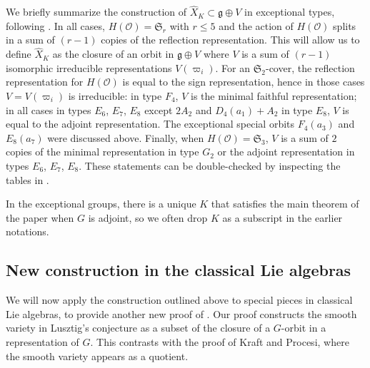 \documentclass{amsart}
\theoremstyle{definition}
\newcommand{\g}{\mathfrak{g}}
\newcommand{\0}{\mathcal{O}}
\begin{document}
We briefly summarize the construction of $\hat{X}_K\subset\g\oplus V$ in exceptional types, following \cite{Sommers:Localsystems}.
In all cases, $H(\0)=\mathfrak{S}_r$ with $r\leq 5$ and the action of $H(\0)$ splits in a sum of $(r-1)$ copies of the reflection representation.
This will allow us to define $\hat{X}_K$ as the closure of an orbit in $\g\oplus V$ where $V$ is a sum of $(r-1)$ isomorphic irreducible representations $V(\varpi_i)$.
For an $\mathfrak{S}_2$-cover, the reflection representation for $H(\0)$ is equal to the sign representation, hence in those cases $V=V(\varpi_i)$ is irreducible: in type $F_4$, $V$ is the minimal faithful representation; in all cases in types $E_6$, $E_7$, $E_8$ except $2A_2$ and $D_4(a_1)+A_2$ in type $E_8$, $V$ is equal to the adjoint representation.
The exceptional special orbits $F_4(a_3)$ and $E_8(a_7)$ were discussed above.
Finally, when $H(\0)=\mathfrak{S}_3$, $V$ is a sum of $2$ copies of the minimal representation in type $G_2$ or the adjoint representation in types $E_6$, $E_7$, $E_8$.
These statements can be double-checked by inspecting the tables in \cite{Lawther-Testerman}.

In the exceptional groups, there is a unique $K$ that satisfies the main theorem of the paper when $G$ is adjoint, so we often 
drop $K$ as a subscript in the earlier notations.

\subsection{New construction in the classical Lie algebras}\label{classicalsubsec}



We will now apply the construction outlined above to special pieces in classical Lie algebras, to provide another new proof of \cite[Thm. 6.2]{Kraft-Procesi:special}.
Our proof constructs the smooth variety in Lusztig's conjecture as a subset of the closure of a $G$-orbit in a representation of $G$.
This contrasts with the proof of Kraft and Procesi, where the smooth variety appears as a quotient.  

\end{document}
